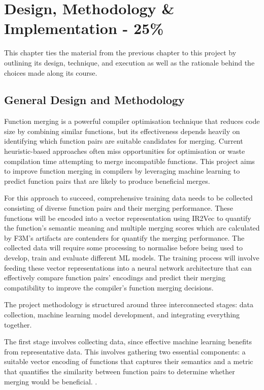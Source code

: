 \chapter{Design, Methodology \& Implementation - 25\%}

This chapter ties the material from the previous chapter to this project by outlining its design, technique, and execution as well as the rationale behind the choices made along its course.

\section{General Design and Methodology}
Function merging is a powerful compiler optimisation technique that reduces code size by combining similar functions, but its effectiveness depends heavily on identifying which function pairs are suitable candidates for merging. Current heuristic-based approaches often miss opportunities for optimisation or waste compilation time attempting to merge incompatible functions. This project aims to improve function merging in compilers by leveraging machine learning to predict function pairs that are likely to produce beneficial merges.

For this approach to succeed, comprehensive training data needs to be collected consisting of diverse function pairs and their merging performance. These functions will be encoded into a vector representation using IR2Vec to quantify the function's semantic meaning and multiple merging scores which are calculated by F3M's artifacts are contenders for quantify the merging performance. The collected data will require some processing to normalise before being used to develop, train and evaluate different ML models. The training process will involve feeding these vector representations into a neural network architecture that can effectively compare function pairs' encodings and predict their merging compatibility to improve the compiler's function merging decisions.

The project methodology is structured around three interconnected stages: data collection, machine learning model development, and integrating everything together.

The first stage involves collecting data, since effective machine learning benefits from representative data. This involves gathering two essential components: a suitable vector encoding of functions that captures their semantics and a metric that quantifies the similarity between function pairs to determine whether merging would be beneficial. .

